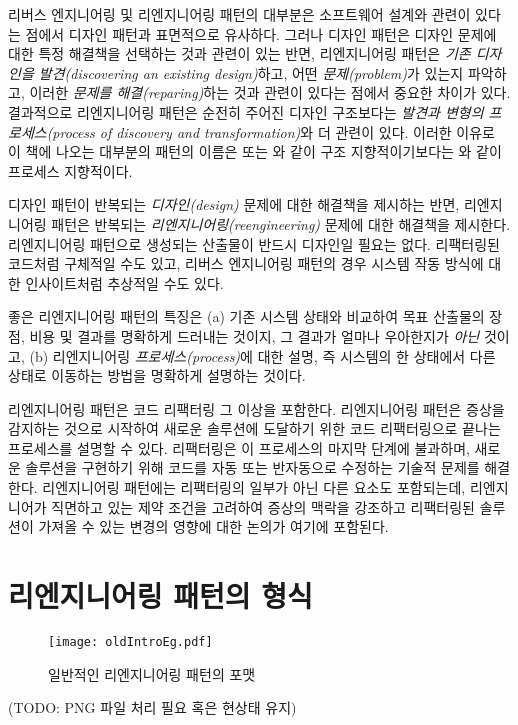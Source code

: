 \documentclass[a4paper,10pt,twoside]{book}
\begin{document}
리버스 엔지니어링 및 리엔지니어링 패턴의 대부분은 소프트웨어 설계와 관련이 있다는 점에서 디자인 패턴과 표면적으로 유사하다. 그러나 디자인 패턴은 디자인 문제에 대한 특정 해결책을 선택하는 것과 관련이 있는 반면, 리엔지니어링 패턴은 \emph{기존 디자인을 발견(discovering an existing design)}하고, 어떤 \emph{문제(problem)}가 있는지 파악하고, 이러한 \emph{문제를 해결(reparing)}하는 것과 관련이 있다는 점에서 중요한 차이가 있다. 결과적으로 리엔지니어링 패턴은 순전히 주어진 디자인 구조보다는 \emph{발견과 변형의 프로세스(process of discovery and transformation)}와 더 관련이 있다. 이러한 이유로 이 책에 나오는 대부분의 패턴의 이름은  또는 와 같이 구조 지향적이기보다는 와 같이 프로세스 지향적이다. 

디자인 패턴이 반복되는 \emph{디자인(design)} 문제에 대한 해결책을 제시하는 반면, 리엔지니어링 패턴은 반복되는 \emph{리엔지니어링(reengineering)} 문제에 대한 해결책을 제시한다. 리엔지니어링 패턴으로 생성되는 산출물이 반드시 디자인일 필요는 없다. 리팩터링된 코드처럼 구체적일 수도 있고, 리버스 엔지니어링 패턴의 경우 시스템 작동 방식에 대한 인사이트처럼 추상적일 수도 있다.

좋은 리엔지니어링 패턴의 특징은 (a) 기존 시스템 상태와 비교하여 목표 산출물의 장점, 비용 및 결과를 명확하게 드러내는 것이지, 그 결과가 얼마나 우아한지가 \emph{아닌} 것이고, (b) 리엔지니어링 \emph{프로세스(process)}에 대한 설명, 즉 시스템의 한 상태에서 다른 상태로 이동하는 방법을 명확하게 설명하는 것이다.

리엔지니어링 패턴은 코드 리팩터링 그 이상을 포함한다. 리엔지니어링 패턴은 증상을 감지하는 것으로 시작하여 새로운 솔루션에 도달하기 위한 코드 리팩터링으로 끝나는 프로세스를 설명할 수 있다. 리팩터링은 이 프로세스의 마지막 단계에 불과하며, 새로운 솔루션을 구현하기 위해 코드를 자동 또는 반자동으로 수정하는 기술적 문제를 해결한다. 리엔지니어링 패턴에는 리팩터링의 일부가 아닌 다른 요소도 포함되는데, 리엔지니어가 직면하고 있는 제약 조건을 고려하여 증상의 맥락을 강조하고 리팩터링된 솔루션이 가져올 수 있는 변경의 영향에 대한 논의가 여기에 포함된다. 
\section{리엔지니어링 패턴의 형식}

\begin{figure}
\begin{center}
\texttt{[image: oldIntroEg.pdf]}
\caption{일반적인 리엔지니어링 패턴의 포맷}
\end{center}
\end{figure}
(TODO: PNG 파일 처리 필요 혹은 현상태 유지)
\end{document}
